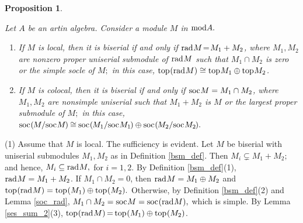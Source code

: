 \documentclass[10pt]{amsart}
\newtheorem{Prop}[Theo]{Proposition}
\theoremstyle{definition}
\newcommand{\mmod}{{\rm mod}}
\newcommand{\rad}{{\rm rad}\hspace{.5pt}}
\newcommand{\soc}{{\rm soc}\hspace{.5pt}}
\newcommand{\ntop}{{\rm top}\hspace{.5pt}}
\begin{document}
\begin{Prop}\label{loc_cloc_bsm}

Let $A$ be an artin algebra. Consider a module $M$ in $\mmod A.$

\begin{enumerate}[$(1)$]

\vspace{-1.5pt}

\item If $M$ is local, then it is biserial if and only if $\rad M\!=\!M_1+M_2$, where $M_1, M_2$ are nonzero proper uniserial submodule of $\rad M$ such that $M_1\cap M_2$ is zero or the simple socle of $M;$ in this case, $\ntop(\rad M)\cong \ntop M_1\oplus \ntop M_2$. 

\vspace{.5pt}

\item If $M$ is colocal, then it is biserial if and only if $\soc M=M_1\cap M_2$, where $M_1, M_2$ are nonsimple uniserial such that $M_1+M_2$ is $M$ or the largest proper submodule of $M;$ in this case, $\soc(\hspace{-.8pt}M/\soc M\hspace{-.8pt}) \hspace{-.5pt} \cong \hspace{-.5pt} \soc(\hspace{-.8pt}M_1/\soc M_1\hspace{-.8pt})\oplus \soc(\hspace{-.8pt} M_2/\soc M_2\hspace{-.8pt}).$ 
    
\end{enumerate} \end{Prop}

\vspace{-1.5pt}

 (1) Assume that $M$ is local. The sufficiency is evident. Let $M$ be biserial with uniserial submodules $M_1, M_2$ as in Definition \ref{bsm_def}. Then $M_i\subsetneq M_1+M_2;$ and hence, $M_i\subseteq \rad M,$ for $i=1,2$. By Definition \ref{bsm_def}(1), $\rad M=M_1+M_2$. If $M_1\cap M_2=0$, then $\rad M=M_1\oplus M_2$ and $\ntop(\rad M)=\ntop(M_1)\oplus \ntop(M_2).$ 
Otherwise, by Definition \ref{bsm_def}(2) and Lemma \ref{soc_rad},
$M_1\cap M_2=\soc M=\soc (\rad M),$ which is simple. By Lemma \ref{ses_sum_2}(3), $\ntop(\rad M) \hspace{-1pt} = \hspace{-1pt} \ntop(M_1)\oplus \ntop(M_2)$. 
\end{document}
